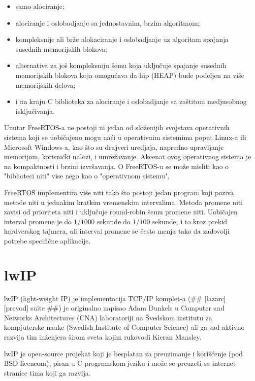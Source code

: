 \documentclass[a4paper,12pt, master]{etf}
\begin{document}
	\begin{itemize}
		\item samo alociranje;
		\item alociranje i oslobodjanje sa jednostavnim, brzim algoritmom;
		\item kompleksnije ali br\v{z}e alokaciranje i oslobadjanje uz algoritam spajanja susednih
		memorijskih blokova;
		\item alternativa za jo\v{s} kompleksniju \v{s}emu koja uklju\v{c}uje spajanje susednih 
		memorijskih	blokova	koja omogu\'{c}ava da hip (HEAP) bude podeljen na vi\v{s}e memorijskih 
		delova;
		\item i na kraju C biblioteka za alociranje i oslobadjanje sa za\v{s}titom medjusobnog 
		isklju\v{c}ivanja.
	\end{itemize}

	Unutar FreeRTOS-a ne postoji ni jedan od slo\v{z}enijih svojstava operativnih sistema koji se
	uobi\v{c}ajeno mogu na\'{c}i u operativnim sistemima poput Linux-a ili Microsoft Windows-a, kao 
	\v{s}to su drajveri uredjaja, napredno upravljanje memorijom, korisni\v{c}ki nalozi, i 
	umre\v{z}avanje. Akcenat ovog operativnog sistema je na kompaktnosti i brzini izvr\v{s}avanja. O 
	FreeRTOS-u se mo\v{z}e misliti kao o "biblioteci niti" vise nego kao o "operativnom sistemu". 

	FreeRTOS implementira vi\v{s}e niti tako \v{s}to postoji jedan program koji poziva metode niti u
	jednakim kratkim vremenskim intervalima. Metoda promene niti zavisi od prioriteta niti i
	uklju\v{c}uje round-robin \v{s}emu promene niti. Uobi\v{c}ajen interval promene je do $1/1000$ sekunde 
	do $1/100$ sekunde, i to kroz prekid hardverskog tajmera, ali interval promene se \v{c}esto menja 
	tako da zadovolji potrebe specifi\v{c}ne aplikacije.

	\section{lwIP}

	lwIP (light-weight IP) je implementacija TCP/IP komplet-a (\#\# [lazarc] [prevod] suite 
	\#\#) je originalno napisao Adam Dunkels u Computer and Networks Architectures (CNA) 
	laboratoriji na	\v{S}vedskom institutu za kompjuterske nauke (Swedish Institute of Computer 
	Science) ali ga sad	aktivno razvija tim in\v{z}enjera \v{s}irom sveta kojim rukovodi Kieran 
	Mansley.

	lwIP je open-source projekat koji je besplatan za preuzimanje i kori\v{s}\'{c}enje (pod BSD 
	licencom), pisan u C programskom jeziku i mo\v{z}e se preuzeti sa internet stranice tima koji 
	ga razvija.
\end{document}
